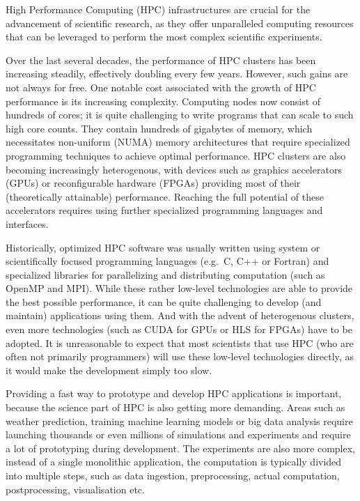 High Performance Computing (HPC) infrastructures are crucial for the advancement of scientific
research, as they offer unparalleled computing resources that can be leveraged to perform the most
complex scientific experiments.

Over the last several decades, the performance of HPC clusters has been increasing steadily, effectively
doubling every few years. However, such gains are not always for free. One notable cost associated with
the growth of HPC performance is its increasing complexity. Computing nodes now consist of hundreds of
cores; it is quite challenging to write programs that can scale to such high core counts.
They contain hundreds of gigabytes of memory, which necessitates non-uniform
(NUMA) memory architectures that require specialized programming techniques to achieve optimal
performance. HPC clusters are also becoming increasingly heterogenous, with devices such as
graphics accelerators (GPUs) or reconfigurable hardware (FPGAs) providing most of their
(theoretically attainable) performance. Reaching the full potential of these accelerators requires
using further specialized programming languages and interfaces.

Historically, optimized HPC software was usually written using system or scientifically focused
programming languages (e.g.~C, C++ or Fortran) and specialized libraries for parallelizing and distributing
computation (such as OpenMP and MPI). While these rather low-level technologies are able to provide
the best possible performance, it can be quite challenging to develop (and maintain) applications
using them. And with the advent of heterogenous clusters, even more technologies (such as CUDA for
GPUs or HLS for FPGAs) have to be adopted. It is unreasonable to expect that most scientists that
use HPC (who are often not primarily programmers) will use these low-level technologies directly,
as it would make the development simply too slow.

Providing a fast way to prototype and develop HPC applications is important, because the science part
of HPC is also getting more demanding. Areas such as weather prediction, training machine learning
models or big data analysis require launching thousands or even millions of simulations and
experiments and require a lot of prototyping during development. The experiments are also more complex,
instead of a single monolithic application, the computation is typically divided into multiple steps,
such as data ingestion, preprocessing, actual computation, postprocessing, visualisation etc.

